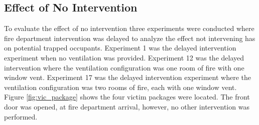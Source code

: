 \documentclass[12pt,oneside]{book}
\begin{document}


\clearpage

\subsection{Effect of No Intervention}


To evaluate the effect of no intervention three experiments were conducted where fire department intervention was delayed to analyze the effect not intervening has on potential trapped occupants. Experiment 1 was the delayed intervention experiment when no ventilation was provided. Experiment 12 was the delayed intervention where the ventilation configuration was one room of fire with one window vent. Experiment 17 was the delayed intervention experiment where the ventilation configuration was two rooms of fire, each with one window vent. Figure \ref{fig:vic_package} shows the four victim packages were located. The front door was opened, at fire department arrival, however, no other intervention was performed. 
\end{document}
